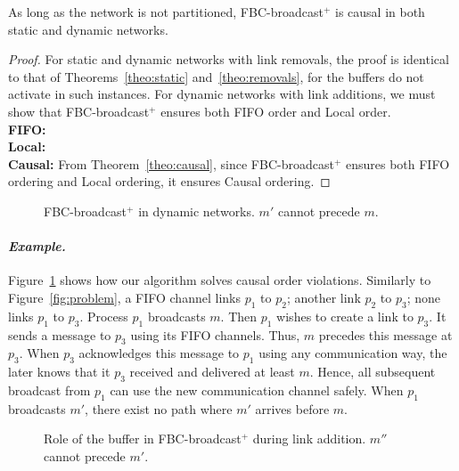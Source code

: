 \begin{theorem}
  As long as the network is not partitioned, FBC-broadcast$^+$ is causal in both
  static and dynamic networks.
\end{theorem}

\begin{proof}
  For static and dynamic networks with link removals, the proof is identical to
  that of Theorems~\ref{theo:static} and~\ref{theo:removals}, for the buffers do
  not activate in such instances. For dynamic networks with link additions, we
  must show that FBC-broadcast$^+$ ensures both
  FIFO order and Local order. \\
  \textbf{FIFO:}  \\
  \textbf{Local:}  \\
  \textbf{Causal:} From Theorem~\ref{theo:causal}, since FBC-broadcast$^+$
  ensures both FIFO ordering and Local ordering, it ensures Causal ordering.
\end{proof}

\begin{figure}
  \begin{center}
    
    \caption{\label{fig:solved}FBC-broadcast$^+$ in dynamic networks. $m'$
      cannot precede $m$.}
  \end{center}
\end{figure}

\paragraph{\emph{Example.}} Figure~\ref{fig:solved} shows how our algorithm
solves causal order violations. Similarly to Figure~\ref{fig:problem}, a FIFO
channel links $p_1$ to $p_2$; another link $p_2$ to $p_3$; none links $p_1$ to
$p_3$. Process $p_1$ broadcasts $m$. Then $p_1$ wishes to create a link to
$p_3$. It sends a message to $p_3$ using its FIFO channels. Thus, $m$ precedes
this message at $p_3$. When $p_3$ acknowledges this message to $p_1$ using any
communication way, the later knows that it $p_3$ received and delivered at least
$m$. Hence, all subsequent broadcast from $p_1$ can use the new communication
channel safely. When $p_1$ broadcasts $m'$, there exist no path where $m'$
arrives before $m$.

\begin{figure}
  \begin{center}
    
    \caption{\label{fig:buffer}Role of the buffer in FBC-broadcast$^+$ during
      link addition. $m''$ cannot precede $m'$. }
  \end{center}
\end{figure}

